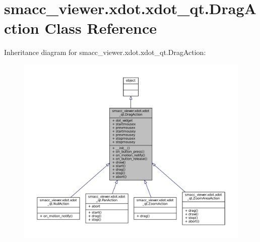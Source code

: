 \hypertarget{classsmacc__viewer_1_1xdot_1_1xdot__qt_1_1DragAction}{}\section{smacc\+\_\+viewer.\+xdot.\+xdot\+\_\+qt.\+Drag\+Action Class Reference}
\label{classsmacc__viewer_1_1xdot_1_1xdot__qt_1_1DragAction}


Inheritance diagram for smacc\+\_\+viewer.\+xdot.\+xdot\+\_\+qt.\+Drag\+Action\+:
\nopagebreak
\begin{figure}[H]
\begin{center}
\leavevmode
\includegraphics[width=350pt]{classsmacc__viewer_1_1xdot_1_1xdot__qt_1_1DragAction__inherit__graph}
\end{center}
\end{figure}


